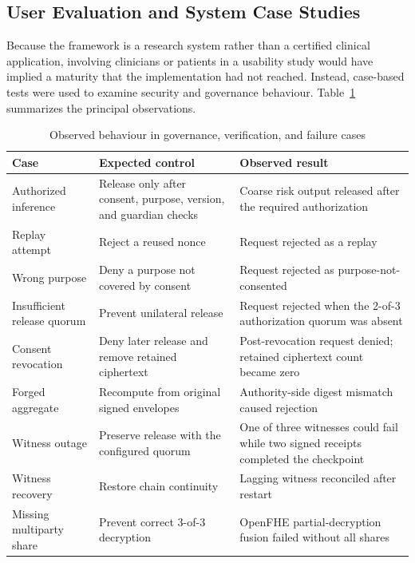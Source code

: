\subsection{User Evaluation and System Case Studies}
\label{subsec:case-studies}

Because the framework is a research system rather than a certified clinical application, involving clinicians or patients in a usability study would have implied a maturity that the implementation had not reached. Instead, case-based tests were used to examine security and governance behaviour. Table~\ref{tab:system-case-results} summarizes the principal observations.

\begin{table}[htbp]
    \centering
    \caption{Observed behaviour in governance, verification, and failure cases}
    \label{tab:system-case-results}
    \begin{tabularx}{\textwidth}{@{}lXX@{}}
        \toprule
        Case & Expected control & Observed result \\
        \midrule
        Authorized inference & Release only after consent, purpose, version, and guardian checks & Coarse risk output released after the required authorization \\
        Replay attempt & Reject a reused nonce & Request rejected as a replay \\
        Wrong purpose & Deny a purpose not covered by consent & Request rejected as purpose-not-consented \\
        Insufficient release quorum & Prevent unilateral release & Request rejected when the 2-of-3 authorization quorum was absent \\
        Consent revocation & Deny later release and remove retained ciphertext & Post-revocation request denied; retained ciphertext count became zero \\
        Forged aggregate & Recompute from original signed envelopes & Authority-side digest mismatch caused rejection \\
        Witness outage & Preserve release with the configured quorum & One of three witnesses could fail while two signed receipts completed the checkpoint \\
        Witness recovery & Restore chain continuity & Lagging witness reconciled after restart \\
        Missing multiparty share & Prevent correct 3-of-3 decryption & OpenFHE partial-decryption fusion failed without all shares \\
        \bottomrule
    \end{tabularx}
\end{table}


